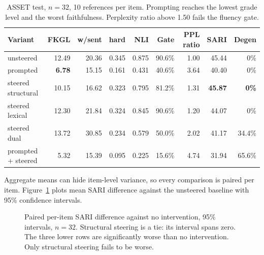 \documentclass[twocolumn,10pt,a4paper]{article}
\begin{document}
\begin{table}[t]
\centering
\small
\begin{tabular}{lrrrrrrrr}
\toprule
Variant & FKGL & w/sent & hard & NLI & Gate & PPL ratio & SARI & Degen \\
\midrule
unsteered             & 12.49 & 20.36 & 0.345 & 0.875 & 90.6\% & 1.00 & 45.44 & 0\% \\
prompted              & \textbf{6.78} & 15.15 & 0.161 & 0.431 & 40.6\% & 3.64 & 40.40 & 0\% \\
steered structural    & 10.15 & 16.62 & 0.323 & 0.795 & 81.2\% & 1.31 & \textbf{45.87} & \textbf{0\%} \\
steered lexical       & 12.30 & 21.84 & 0.324 & 0.845 & 90.6\% & 1.20 & 44.07 & 0\% \\
steered dual          & 13.72 & 30.85 & 0.234 & 0.579 & 50.0\% & 2.02 & 41.17 & 34.4\% \\
prompted + steered    & 5.32 & 15.39 & 0.095 & 0.225 & 15.6\% & 4.74 & 31.94 & 65.6\% \\
\bottomrule
\end{tabular}
\caption{ASSET test, $n=32$, 10 references per item. Prompting reaches the lowest
grade level and the worst faithfulness. Perplexity ratio above 1.50 fails the
fluency gate.}
\label{tab:eval}
\end{table}

Aggregate means can hide item-level variance, so every comparison is paired
per item. Figure~\ref{fig:forest} plots mean SARI difference against the
unsteered baseline with 95\% confidence intervals.

\begin{figure}[t]
\centering
{}
\caption{Paired per-item SARI difference against no intervention, 95\% intervals,
$n=32$. Structural steering is a tie: its interval spans zero. The three lower
rows are significantly worse than no intervention. Only structural steering fails
to be worse.}
\label{fig:forest}
\end{figure}
\end{document}
